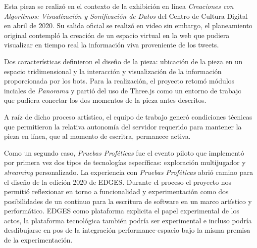 Esta pieza se realizó en el contexto de la exhibición en línea \textit{Creaciones con Algoritmos: Visualización y Sonificación de Datos} del Centro de Cultura Digital en abril de 2020. Su salida oficial se realizó en video sin embargo, el planeamiento original contempló la creación de un espacio virtual en la web que pudiera visualizar en tiempo real la información viva proveniente de los tweets.

Dos características definieron el diseño de la pieza: ubicación de la pieza en un espacio tridimensional y la interacción y visualización de la información proporcionada por los bots. Para la realización, el proyecto retomó módulos inciales de \textit{Panorama} y partió del uso de Three.js como un entorno de trabajo que pudiera conectar los dos momentos de la pieza antes descritos. 

A raíz de dicho proceso artístico, el equipo de trabajo generó condiciones técnicas que permitieron la relativa autonomía del servidor requerido para mantener la pieza en línea, que al momento de escritra, permanece activa.






Como un segundo caso, \textit{Pruebas Proféticas} fue el evento piloto que implementó por primera vez dos tipos de tecnologías específicas: exploración multijugador y \textit{streaming} personalizado. La experiencia con \textit{Pruebas Proféticas} abrió camino para el diseño de la edición 2020 de EDGES. Durante el proceso el proyecto nos permitió reflexionar en torno a funcionalidad y experimentación como dos posibilidades de un continuo para la escritura de software en un marco artístico y performático. EDGES como plataforma explicita el papel experimental de los actos, la plataforma tecnológica también podría ser experimental e incluso podría desdibujarse en pos de la integración performance-espacio bajo la misma premisa de la experimentación.

